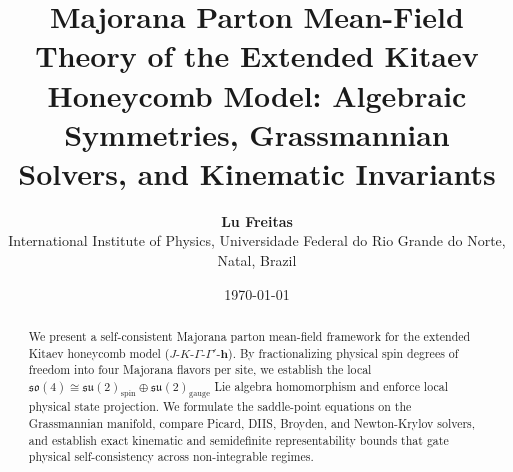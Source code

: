 \documentclass[11pt,a4paper]{article}
\title{\textbf{Majorana Parton Mean-Field Theory of the Extended Kitaev Honeycomb Model: Algebraic Symmetries, Grassmannian Solvers, and Kinematic Invariants}}
\author{\textbf{Lu Freitas}\\[1mm]
\small International Institute of Physics, Universidade Federal do Rio Grande do Norte, Natal, Brazil}
\date{\today}
\begin{document}
\maketitle

\begin{abstract}
We present a self-consistent Majorana parton mean-field framework for the extended Kitaev honeycomb model ($J\text{-}K\text{-}\Gamma\text{-}\Gamma'\text{-}\mathbf{h}$). By fractionalizing physical spin degrees of freedom into four Majorana flavors per site, we establish the local $\mathfrak{so}(4) \cong \mathfrak{su}(2)_{\mathrm{spin}} \oplus \mathfrak{su}(2)_{\mathrm{gauge}}$ Lie algebra homomorphism and enforce local physical state projection. We formulate the saddle-point equations on the Grassmannian manifold, compare Picard, DIIS, Broyden, and Newton-Krylov solvers, and establish exact kinematic and semidefinite representability bounds that gate physical self-consistency across non-integrable regimes.
\end{abstract}

\tableofcontents
\newpage









\end{document}
